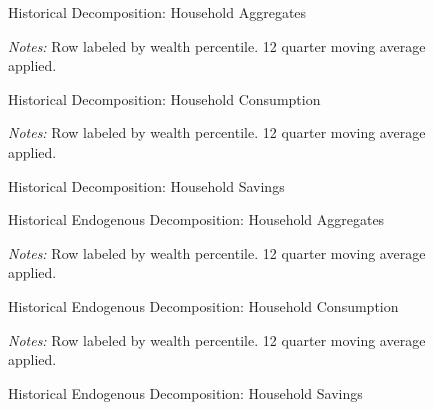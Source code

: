 \begin{figure}[t]
    \centering
    \caption{Historical Decomposition: Household Aggregates}
    
    \label{fig:agg-hist-decomp}
\end{figure}

\begin{figure}[t]
    \centering
    \caption{Historical Decomposition: Household Consumption}
    
    {\scriptsize \emph{Notes:} Row labeled by wealth percentile. 12 quarter moving average applied.}
    \label{fig:cons-hist-decomp}
\end{figure}

\begin{figure}[t]
    \centering
    \caption{Historical Decomposition: Household Savings}
    
    {\scriptsize \emph{Notes:} Row labeled by wealth percentile. 12 quarter moving average applied.}
    \label{fig:sav-hist-decomp}
\end{figure}

\begin{figure}[t]
    \centering
    \caption{Historical Endogenous Decomposition: Household Aggregates}
    
    \label{fig:agg-endog-hist-decomp}
\end{figure}

\begin{figure}[t]
    \centering
    \caption{Historical Endogenous Decomposition: Household Consumption}
    

    {\scriptsize \emph{Notes:} Row labeled by wealth percentile. 12 quarter moving average applied.}
    \label{fig:cons-endog-hist-decomp}
\end{figure}

\begin{figure}[t]
    \centering
    \caption{Historical Endogenous Decomposition: Household Savings}
    

    {\scriptsize \emph{Notes:} Row labeled by wealth percentile. 12 quarter moving average applied.}
    \label{fig:sav-endog-hist-decomp}
\end{figure}




